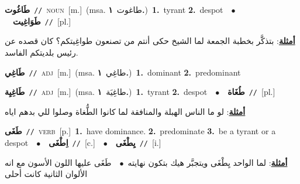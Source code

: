 \documentclass[10pt,a4paper,twoside]{article} %
\begin{document}
\begin{multicols}{2}
{\setlength\topsep{0pt}\textbf{\foreignlanguage{arabic}{طَاغُوت}}\ {\color{gray}\texttt{//}\color{black}}\ \textsc{noun}\ [m.]\ \color{gray}(msa. \foreignlanguage{arabic}{طاغوت}~\foreignlanguage{arabic}{\textbf{١.}})\color{black}\ \textbf{1.}~tyrant  \textbf{2.}~despot\ \ $\bullet$\ \ \setlength\topsep{0pt}\textbf{\foreignlanguage{arabic}{طَوَاغِيت}}\ {\color{gray}\texttt{//}\color{black}}\ [pl.]\  \begin{flushright}\color{gray}\foreignlanguage{arabic}{\textbf{\underline{\foreignlanguage{arabic}{أمثلة}}}: بتذكَّر بخطبة الجمعة لما الشيخ حكى أنتم من تصنعون طواغِيتكم؟ كان قصده عن رئيس بلديتكم الفاسد.}\end{flushright}\color{black}} \vspace{2mm}

{\setlength\topsep{0pt}\textbf{\foreignlanguage{arabic}{طَاغِي}}\ {\color{gray}\texttt{//}\color{black}}\ \textsc{adj}\ [m.]\ \color{gray}(msa. \foreignlanguage{arabic}{طاغِي}~\foreignlanguage{arabic}{\textbf{١.}})\color{black}\ \textbf{1.}~dominant  \textbf{2.}~predominant\ } \vspace{2mm}

{\setlength\topsep{0pt}\textbf{\foreignlanguage{arabic}{طَاغِيِة}}\ {\color{gray}\texttt{//}\color{black}}\ \textsc{adj}\ [m.]\ \color{gray}(msa. \foreignlanguage{arabic}{طاغِيَة}~\foreignlanguage{arabic}{\textbf{١.}})\color{black}\ \textbf{1.}~tyrant  \textbf{2.}~despot\ \ $\bullet$\ \ \setlength\topsep{0pt}\textbf{\foreignlanguage{arabic}{طُغَاة}}\ {\color{gray}\texttt{//}\color{black}}\ [pl.]\  \begin{flushright}\color{gray}\foreignlanguage{arabic}{\textbf{\underline{\foreignlanguage{arabic}{أمثلة}}}: لو ما الناس الهبلة والمنافقة لما كانوا الطُّغاة وصلوا للي بدهم اياه}\end{flushright}\color{black}} \vspace{2mm}

{\setlength\topsep{0pt}\textbf{\foreignlanguage{arabic}{طَغَى}}\ {\color{gray}\texttt{//}\color{black}}\ \textsc{verb}\ [p.]\ \textbf{1.}~have dominance.  \textbf{2.}~predominate  \textbf{3.}~be a tyrant or a despot\ \ $\bullet$\ \ \setlength\topsep{0pt}\textbf{\foreignlanguage{arabic}{اِطْغَى}}\ {\color{gray}\texttt{//}\color{black}}\ [c.]\ \ $\bullet$\ \ \setlength\topsep{0pt}\textbf{\foreignlanguage{arabic}{يِطْغَى}}\ {\color{gray}\texttt{//}\color{black}}\ [i.]\  \begin{flushright}\color{gray}\foreignlanguage{arabic}{\textbf{\underline{\foreignlanguage{arabic}{أمثلة}}}: لما الواحد يِطْغَى ويتجبَّر هيك بتكون نهايته\ $\bullet$\ \  طَغَى عليها اللون الأسون مع انه الألوان الثانية كانت أحلى}\end{flushright}\color{black}} \vspace{2mm}


\end{multicols}
\end{document}
